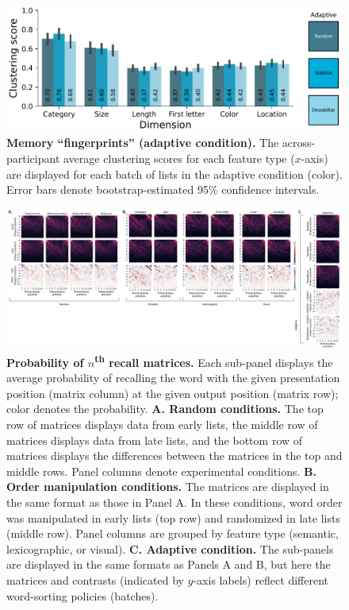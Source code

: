 \documentclass{article}
\begin{document}
\begin{figure}[tp] \centering
    \includegraphics[width=\textwidth]{figures/fingerprints_adaptive}
    
\caption{\textbf{Memory ``fingerprints'' (adaptive condition).} The
across-participant average clustering scores for each feature type ($x$-axis) are
displayed for each batch of lists in the adaptive condition (color). Error bars denote
bootstrap-estimated 95\% confidence intervals.}

\label{fig:fingerprints-adaptive} \end{figure}


\begin{figure}
    \includegraphics[width=\textwidth]{figures/pnr_matrices}

    \caption{\textbf{Probability of $n$\textsuperscript{th} recall matrices.}
    Each sub-panel displays the average probability of recalling the word with the given 
    presentation position (matrix column) at the given output position (matrix
    row); color denotes the probability. \textbf{A. Random conditions.} The top
    row of matrices displays data from early lists, the
    middle row of matrices displays data from late lists,
    and the bottom row of matrices displays the differences between the 
    matrices in the top and middle rows. Panel columns denote experimental
    conditions. \textbf{B. Order manipulation conditions.} The matrices are
    displayed in the same format as those in Panel A. In these conditions, word order 
    was manipulated in early lists (top row) and randomized in late lists (middle row). Panel columns are
    grouped by feature type (semantic, lexicographic, or visual). \textbf{C.
    Adaptive condition.} The sub-panels are displayed in the same formats as
    Panels A and B, but here the matrices and contrasts (indicated by $y$-axis
    labels) reflect different word-sorting policies (batches).}

    \label{fig:pnr}
\end{figure}
\end{document}
